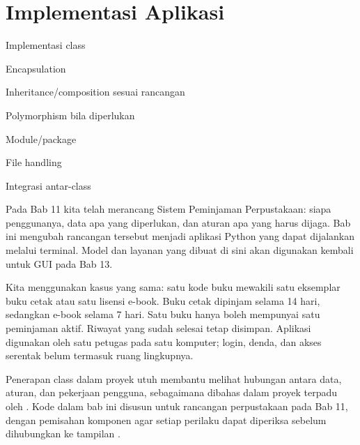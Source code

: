 \chapter{Implementasi Aplikasi}

\begingroup
\ifPDFTeX\else
\fi

\begin{dibabini}
  \item Implementasi class
  \item Encapsulation
  \item Inheritance/composition sesuai rancangan
  \item Polymorphism bila diperlukan
  \item Module/package
  \item File handling
  \item Integrasi antar-class
\end{dibabini}

Pada Bab 11 kita telah merancang Sistem Peminjaman Perpustakaan: siapa penggunanya, data apa yang diperlukan, dan aturan apa yang harus dijaga. Bab ini mengubah rancangan tersebut menjadi aplikasi Python yang dapat dijalankan melalui terminal. Model dan layanan yang dibuat di sini akan digunakan kembali untuk GUI pada Bab 13.

Kita menggunakan kasus yang sama: satu kode buku mewakili satu eksemplar buku cetak atau satu lisensi e-book. Buku cetak dipinjam selama 14 hari, sedangkan e-book selama 7 hari. Satu buku hanya boleh mempunyai satu peminjaman aktif. Riwayat yang sudah selesai tetap disimpan. Aplikasi digunakan oleh satu petugas pada satu komputer; login, denda, dan akses serentak belum termasuk ruang lingkupnya.

Penerapan class dalam proyek utuh membantu melihat hubungan antara data, aturan, dan pekerjaan pengguna, sebagaimana dibahas dalam proyek terpadu oleh \cite{north2025oop}. Kode dalam bab ini disusun untuk rancangan perpustakaan pada Bab 11, dengan pemisahan komponen agar setiap perilaku dapat diperiksa sebelum dihubungkan ke tampilan \cite{wilson2024design}.

